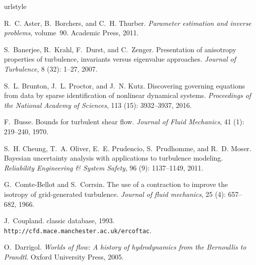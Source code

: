 \documentclass[a4paper]{ar-1col}
\begin{document}
\begin{thebibliography}{82}
\providecommand{\natexlab}[1]{#1}
\providecommand{\url}[1]{\texttt{#1}}
\expandafter\ifx\csname urlstyle\endcsname\relax
  \providecommand{\doi}[1]{doi: #1}\else
  \providecommand{\doi}{doi: \begingroup \urlstyle{rm}\Url}\fi

R.~C. Aster, B.~Borchers, and C.~H. Thurber.
\newblock \emph{Parameter estimation and inverse problems}, volume~90.
\newblock Academic Press, 2011.

S.~Banerjee, R.~Krahl, F.~Durst, and C.~Zenger.
\newblock Presentation of anisotropy properties of turbulence, invariants
  versus eigenvalue approaches.
\newblock \emph{Journal of Turbulence}, 8 (32): 1--27, 2007.

S.~L. Brunton, J.~L. Proctor, and J.~N. Kutz.
\newblock Discovering governing equations from data by sparse identification of
  nonlinear dynamical systems.
\newblock \emph{Proceedings of the National Academy of Sciences}, 113
  (15): 3932--3937, 2016.

F.~Busse.
\newblock Bounds for turbulent shear flow.
\newblock \emph{Journal of Fluid Mechanics}, 41 (1):
  219--240, 1970.

S.~H. Cheung, T.~A. Oliver, E.~E. Prudencio, S.~Prudhomme, and R.~D. Moser.
\newblock Bayesian uncertainty analysis with applications to turbulence
  modeling.
\newblock \emph{Reliability Engineering \& System Safety}, 96
  (9): 1137--1149, 2011.

G.~Comte-Bellot and S.~Corrsin.
\newblock The use of a contraction to improve the isotropy of grid-generated
  turbulence.
\newblock \emph{Journal of fluid mechanics}, 25 (4):
  657--682, 1966.

J.~Coupland.
 classic database, 1993.
\newblock \url{http://cfd.mace.manchester.ac.uk/ercoftac}.

O.~Darrigol.
\newblock \emph{Worlds of flow: A history of hydrodynamics from the {Bernoullis
  to Prandtl}}.
\newblock Oxford University Press, 2005.


\end{thebibliography}
\end{document}

